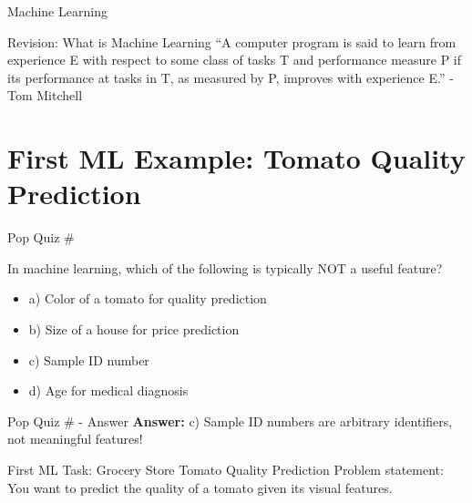 \documentclass[usenames,dvipsnames]{beamer}
\begin{document}
\begin{frame}{Machine Learning}
\end{frame}

\begin{frame}{Revision: What is Machine Learning}
``A computer program is said to learn from
experience E with respect to some class of tasks T
and performance measure P if its performance at
tasks in T, as measured by P, improves with
experience E.'' - Tom Mitchell
\end{frame}

\section{First ML Example: Tomato Quality Prediction}

\begin{frame}{Pop Quiz \#\thepopquiz}
\begin{popquizbox}{\thepopquiz}
In machine learning, which of the following is typically NOT a useful feature?
\begin{itemize}
	\item a) Color of a tomato for quality prediction
	\item b) Size of a house for price prediction  
	\item c) Sample ID number
	\item d) Age for medical diagnosis
\end{itemize}
\end{popquizbox}
\end{frame}

\begin{frame}{Pop Quiz \#\thepopquiz{} - Answer}
\textbf{Answer:} c) Sample ID numbers are arbitrary identifiers, not meaningful features!
\end{frame}

\begin{frame}{First ML Task: Grocery Store Tomato Quality Prediction}
Problem statement: You want to predict the quality of a tomato given its visual features.
\end{frame}
\end{document}
